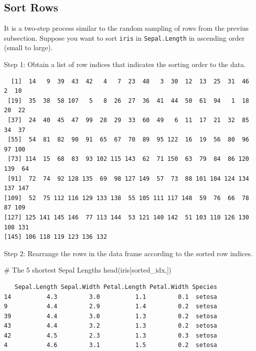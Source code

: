 \documentclass[
  letterpaper,
]{book}
\newenvironment{Shaded}{\begin{snugshade}}{\end{snugshade}}
\newcommand{\CommentTok}[1]{\textcolor[rgb]{0.37,0.37,0.37}{#1}}
\newcommand{\FunctionTok}[1]{\textcolor[rgb]{0.28,0.35,0.67}{#1}}
\newcommand{\NormalTok}[1]{\textcolor[rgb]{0.00,0.23,0.31}{#1}}
\newcommand{\OtherTok}[1]{\textcolor[rgb]{0.00,0.23,0.31}{#1}}
\newcommand{\SpecialCharTok}[1]{\textcolor[rgb]{0.37,0.37,0.37}{#1}}
\begin{document}
\subsection{Sort Rows}\label{sort-rows}

It is a two-step process similar to the random sampling of rows from the
previus subsection. Suppose you want to sort \texttt{iris} in
\texttt{Sepal.Length} in ascending order (small to large).

Step 1: Obtain a list of row indices that indicates the sorting order to
the data.

\begin{Shaded}
\end{Shaded}

\begin{verbatim}
  [1]  14   9  39  43  42   4   7  23  48   3  30  12  13  25  31  46   2  10
 [19]  35  38  58 107   5   8  26  27  36  41  44  50  61  94   1  18  20  22
 [37]  24  40  45  47  99  28  29  33  60  49   6  11  17  21  32  85  34  37
 [55]  54  81  82  90  91  65  67  70  89  95 122  16  19  56  80  96  97 100
 [73] 114  15  68  83  93 102 115 143  62  71 150  63  79  84  86 120 139  64
 [91]  72  74  92 128 135  69  98 127 149  57  73  88 101 104 124 134 137 147
[109]  52  75 112 116 129 133 138  55 105 111 117 148  59  76  66  78  87 109
[127] 125 141 145 146  77 113 144  53 121 140 142  51 103 110 126 130 108 131
[145] 106 118 119 123 136 132
\end{verbatim}

Step 2: Rearrange the rows in the data frame according to the sorted row
indices.

\begin{Shaded}
\begin{Highlighting}[]
\CommentTok{\# The 5 shortest Sepal Lengths}
\FunctionTok{head}\NormalTok{(iris[sorted\_idx,])}
\end{Highlighting}
\end{Shaded}

\begin{verbatim}
   Sepal.Length Sepal.Width Petal.Length Petal.Width Species
14          4.3         3.0          1.1         0.1  setosa
9           4.4         2.9          1.4         0.2  setosa
39          4.4         3.0          1.3         0.2  setosa
43          4.4         3.2          1.3         0.2  setosa
42          4.5         2.3          1.3         0.3  setosa
4           4.6         3.1          1.5         0.2  setosa
\end{verbatim}
\end{document}
